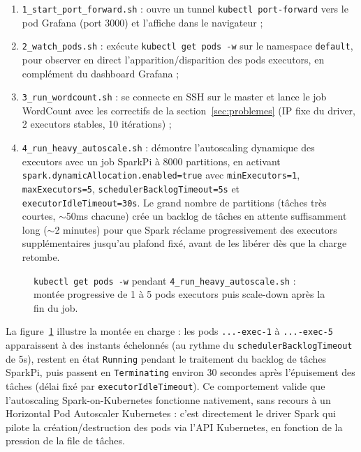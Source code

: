 \documentclass{name}
\begin{document}
\begin{enumerate}
    \item \texttt{1\_start\_port\_forward.sh} : ouvre un tunnel \texttt{kubectl port-forward} vers le pod Grafana (port 3000) et l'affiche dans le navigateur ;
    \item \texttt{2\_watch\_pods.sh} : exécute \texttt{kubectl get pods -w} sur le namespace \texttt{default}, pour observer en direct l'apparition/disparition des pods executors, en complément du dashboard Grafana ;
    \item \texttt{3\_run\_wordcount.sh} : se connecte en SSH sur le master et lance le job WordCount avec les correctifs de la section~\ref{sec:problemes} (IP fixe du driver, 2 executors stables, 10 itérations) ;
    \item \texttt{4\_run\_heavy\_autoscale.sh} : démontre l'autoscaling dynamique des executors avec un job SparkPi à 8000 partitions, en activant \texttt{spark.dynamicAllocation.enabled=true} avec \texttt{minExecutors=1}, \texttt{maxExecutors=5}, \texttt{schedulerBacklogTimeout=5s} et \texttt{executorIdleTimeout=30s}. Le grand nombre de partitions (tâches très courtes, $\sim$50ms chacune) crée un backlog de tâches en attente suffisamment long ($\sim$2 minutes) pour que Spark réclame progressivement des executors supplémentaires jusqu'au plafond fixé, avant de les libérer dès que la charge retombe.
\end{enumerate}

\begin{figure}[H]
    \centering
    \fbox{\rule{0.9\textwidth}{0pt}\rule{0pt}{6cm}}
    \caption{\texttt{kubectl get pods -w} pendant \texttt{4\_run\_heavy\_autoscale.sh} : montée progressive de 1 à 5 pods executors puis scale-down après la fin du job.}
    \label{fig:autoscale-pods}
\end{figure}

La figure~\ref{fig:autoscale-pods} illustre la montée en charge : les pods \texttt{...-exec-1} à \texttt{...-exec-5} apparaissent à des instants échelonnés (au rythme du \texttt{schedulerBacklogTimeout} de 5s), restent en état \texttt{Running} pendant le traitement du backlog de tâches SparkPi, puis passent en \texttt{Terminating} environ 30 secondes après l'épuisement des tâches (délai fixé par \texttt{executorIdleTimeout}). Ce comportement valide que l'autoscaling Spark-on-Kubernetes fonctionne nativement, sans recours à un Horizontal Pod Autoscaler Kubernetes : c'est directement le driver Spark qui pilote la création/destruction des pods via l'API Kubernetes, en fonction de la pression de la file de tâches.
\end{document}
